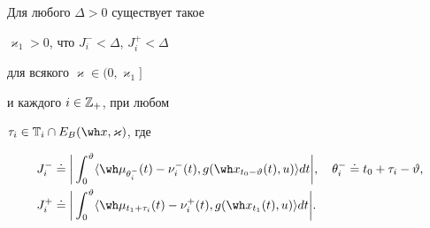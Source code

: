 \begin{lems}


Для любого $\Delta>0$ существует такое


$\varkappa_1>0$, что $J_{i}^{-}<\Delta$, $J_i^+<\Delta$


для всякого $\varkappa\in(0,\varkappa_1]$


и каждого $i\in\Bbb Z_+$, при любом


$\tau_{i}\in\bT_i\cap E_B(\wh x,\varkappa)$, где


\begin{align}


J_i^-&\doteq\bigg|\int_0^\vartheta\langle\wh\mu_{\theta_i^-}(t)-


\nu_i^-(t),g(\wh x_{t_0-\vartheta}(t),u)\rangle dt\bigg|,


\quad \theta_i^-\doteq t_0+\tau_{i}-\vartheta,\\


J_i^+&\doteq\bigg|\int_0^\vartheta


\langle\wh\mu_{t_1+\tau_i}(t)-\nu_i^+(t),


g(\wh x_{t_1}(t),u)\rangle dt\bigg|.


\end{align}


\end{lems}





